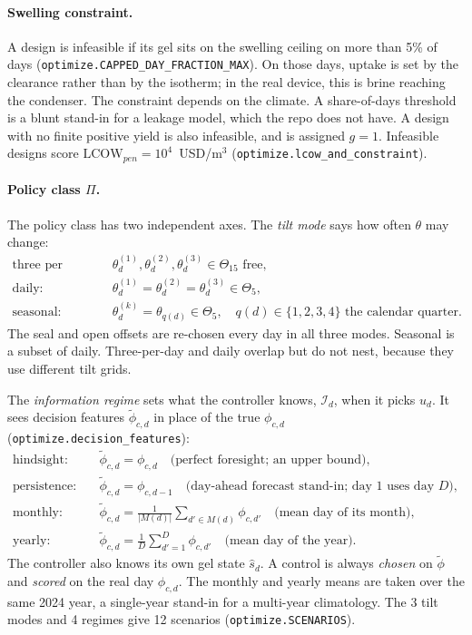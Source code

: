 \documentclass[11pt]{article}
\newcommand{\code}[1]{\texttt{#1}}
\begin{document}
\paragraph{Swelling constraint.} A design is infeasible if its gel sits on the swelling
ceiling on more than 5\% of days (\code{optimize.CAPPED\_DAY\_FRACTION\_MAX}). On those
days, uptake is set by the clearance rather than by the isotherm; in the real device, this
is brine reaching the condenser. The constraint depends on the climate. A share-of-days
threshold is a blunt stand-in for a leakage model, which the repo does not have. A design
with no finite positive yield is also infeasible, and is assigned $g = 1$. Infeasible
designs score $\mathrm{LCOW}_{pen} = 10^4$~USD/m$^3$ (\code{optimize.lcow\_and\_constraint}).

\paragraph{Policy class $\Pi$.} The policy class has two independent axes. The \emph{tilt
mode} says how often $\theta$ may change:
\begin{align}
\text{three per day:} &\quad \theta^{(1)}_d, \theta^{(2)}_d, \theta^{(3)}_d \in \Theta_{15} \text{ free}, \\
\text{daily:}         &\quad \theta^{(1)}_d = \theta^{(2)}_d = \theta^{(3)}_d \in \Theta_5, \\
\text{seasonal:}      &\quad \theta^{(k)}_d = \theta_{q(d)} \in \Theta_5, \quad q(d) \in \{1,2,3,4\} \text{ the calendar quarter}.
\end{align}
The seal and open offsets are re-chosen every day in all three modes. Seasonal is a subset
of daily. Three-per-day and daily overlap but do not nest, because they use different tilt
grids.

The \emph{information regime} sets what the controller knows, $\mathcal{I}_d$, when it
picks $u_d$. It sees decision features $\tilde\phi_{c,d}$ in place of the true $\phi_{c,d}$
(\code{optimize.decision\_features}):
\begin{align}
\text{hindsight:}   &\quad \tilde\phi_{c,d} = \phi_{c,d} \quad \text{(perfect foresight; an upper bound)}, \\
\text{persistence:} &\quad \tilde\phi_{c,d} = \phi_{c,d-1} \quad \text{(day-ahead forecast stand-in; day 1 uses day } D), \\
\text{monthly:}     &\quad \tilde\phi_{c,d} = \tfrac{1}{|M(d)|}\textstyle\sum_{d' \in M(d)} \phi_{c,d'} \quad \text{(mean day of its month)}, \\
\text{yearly:}      &\quad \tilde\phi_{c,d} = \tfrac{1}{D}\textstyle\sum_{d'=1}^{D} \phi_{c,d'} \quad \text{(mean day of the year)}.
\end{align}
The controller also knows its own gel state $\hat s_d$. A control is always \emph{chosen} on
$\tilde\phi$ and \emph{scored} on the real day $\phi_{c,d}$. The monthly and yearly means are
taken over the same 2024 year, a single-year stand-in for a multi-year climatology. The 3
tilt modes and 4 regimes give 12 scenarios (\code{optimize.SCENARIOS}).
\end{document}
